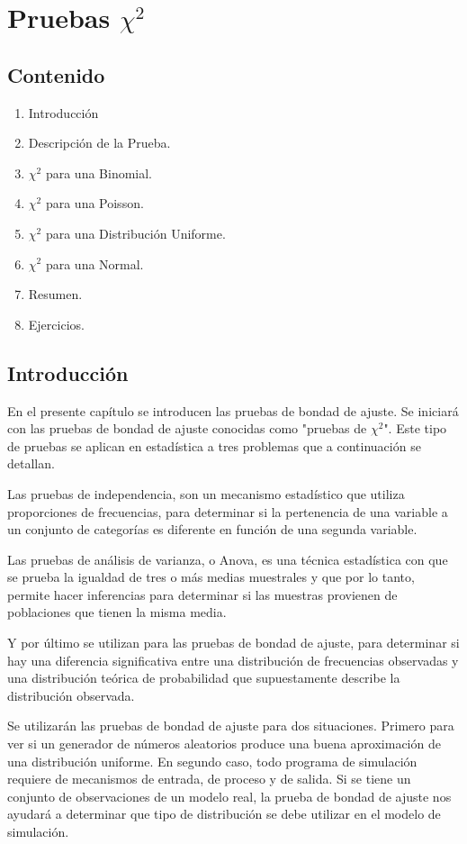 \chapter{Pruebas $\chi^2$}

\section*{Contenido}
\begin{enumerate}
    \item Introducción
    \item Descripción de la Prueba.
\item $\chi^2$ para una Binomial.
\item $\chi^2$ para una Poisson.
\item $\chi^2$ para una Distribución Uniforme.
\item $\chi^2$ para una Normal.
\item Resumen.
\item Ejercicios.
\end{enumerate}

\section{Introducción}

En el presente capítulo se introducen las pruebas de bondad de ajuste. Se iniciará con las pruebas de bondad de ajuste conocidas como "pruebas de $\chi^2$". Este tipo de pruebas se aplican en estadística a tres problemas que a continuación se detallan. 

Las pruebas de independencia, son un mecanismo estadístico que utiliza proporciones de frecuencias, para determinar si la pertenencia de una variable a un conjunto de categorías es diferente en función de una segunda variable.

Las pruebas de análisis de varianza, o Anova, es una técnica estadística con que se prueba la igualdad de tres o más medias muestrales y que por lo tanto, permite hacer inferencias para determinar si las muestras provienen de poblaciones que tienen la misma media. 

Y por último se utilizan para las pruebas de bondad de ajuste, para determinar si hay una diferencia significativa entre una distribución de frecuencias observadas y una distribución teórica de probabilidad que supuestamente describe la distribución observada.

Se utilizarán las pruebas de bondad de ajuste para dos situaciones. Primero para ver si un generador de números aleatorios produce una buena aproximación de una distribución uniforme. En segundo caso, todo programa de simulación requiere de mecanismos de entrada, de proceso y de salida. Si se tiene un conjunto de observaciones de un modelo real, la prueba de bondad de ajuste nos ayudará a determinar que tipo de distribución se debe utilizar en el modelo de simulación.


